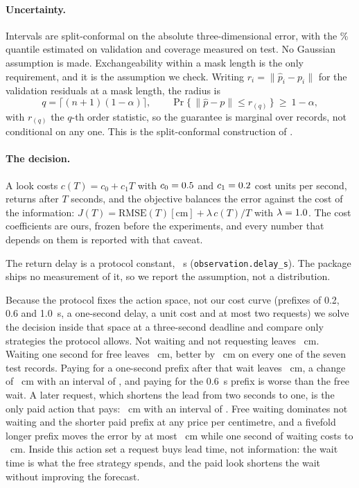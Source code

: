 \documentclass{swmcmthesis}
\begin{document}
\paragraph{Uncertainty.} Intervals are split-conformal on the absolute three-dimensional error,
with the \slotConfLevel{}\% quantile estimated on validation and coverage measured
on test. No Gaussian assumption is made. Exchangeability within a mask length is
the only requirement, and it is the assumption we check. Writing $r_i=\lVert\hat p_i-p_i\rVert$
for the validation residuals at a mask length, the radius is
\begin{equation}
\label{eq:conformal}
q=\Big\lceil (n+1)(1-\alpha)\Big\rceil,\qquad
\Pr\bigl\{\,\lVert\hat p-p\rVert\le r_{(q)}\,\bigr\}\ \ge\ 1-\alpha,
\end{equation}
with $r_{(q)}$ the $q$-th order statistic, so the guarantee is marginal over records,
not conditional on any one. This is the split-conformal
construction of \cite{vovk2005}.

\paragraph{The decision.} A look costs $c(T)=c_0+c_1T$ with $c_0=0.5$
and $c_1=0.2$ cost units per second, returns after $T$ seconds, and the
objective balances the error against the cost of the information:
$J(T)=\mathrm{RMSE}(T)[\mathrm{cm}]+\lambda\,c(T)/T$ with $\lambda=1.0$.
The cost coefficients are ours, frozen before the experiments, and every number
that depends on them is reported with that caveat.

The return delay is a protocol constant, \slotPSchedDelayDistribution{}~s
(\texttt{observation.delay\_s}). The package ships no measurement of it, so we
report the assumption, not a distribution.

Because the protocol fixes the action space, not our cost curve (prefixes of 0.2, 0.6 and 1.0~s, a one-second delay, a unit cost and at most two
requests) we solve the decision inside that space at a three-second deadline and
compare only strategies the protocol allows. Not waiting and not requesting leaves
\slotPFrNoWait{}~cm. Waiting one second for free leaves \slotPFrFreeWait{}~cm, better by
\slotPFrNoWaitToFree{}~cm on every one of the seven test records. Paying for a
one-second prefix after that wait leaves \slotPFrPaidOne{}~cm, a change of
\slotPFrFreeToPaid{}~cm with an interval of \slotPFrFreeToPaidCI{}, and paying for the
0.6~s prefix is worse than the free wait. A later request, which shortens the lead from
two seconds to one, is the only paid action that pays: \slotPFrPaidToTwo{}~cm with an
interval of \slotPFrPaidToTwoCI{}. Free waiting dominates not waiting and the
shorter paid prefix at any price per centimetre, and a fivefold longer prefix moves the
error by at most \slotPPrefixGainMax{}~cm while one second of waiting costs
\slotPDelayPenaltyMin{} to \slotPDelayPenaltyMax{}~cm. Inside this action set a request
buys lead time, not information: the wait time is what the free strategy spends, and the
paid look shortens the wait without improving the forecast.
\end{document}
